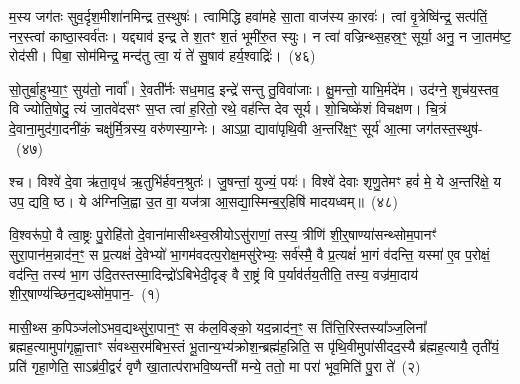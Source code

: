 म॒स्य जग॑तः सुव॒र्दृश॒मीशा॑नमिन्द्र त॒स्थुषः॑। त्वामिद्धि हवा॑महे सा॒ता वाज॑स्य का॒रवः॑। त्वां वृ॒त्रेष्वि॑न्द्र॒ सत्प॑तिं॒ नर॒स्त्वां काष्ठा॒स्वर्व॑तः। यद्द्याव॑ इन्द्र ते श॒तꣳ श॒तं भूमी॑रु॒त स्युः। न त्वा॑ वज्रिन्थ्स॒हस्र॒ꣳ॒ सूर्या॒ अनु॒ न जा॒तम॑ष्ट॒ रोद॑सी। पिबा॒ सोम॑मिन्द्र॒ मन्द॑तु त्वा॒ यं ते॑ सु॒षाव॑ हर्य॒श्वाद्रिः॑।~(४६)

सो॒तुर्बा॒हुभ्या॒ꣳ॒ सुय॑तो॒ नार्वा᳚। रे॒वती᳚र्नः सध॒माद॒ इन्द्रे॑ सन्तु तु॒विवा॑जाः। क्षु॒मन्तो॒ याभि॒र्मदे॑म। उद॑ग्ने॒ शुच॑य॒स्तव॒ वि ज्योति॒षोदु॒ त्यं जा॒तवे॑दसꣳ स॒प्त त्वा॑ ह॒रितो॒ रथे॒ वह॑न्ति देव सूर्य। शो॒चिष्के॑शं विचक्षण। चि॒त्रं दे॒वाना॒मुद॑गा॒दनी॑कं॒ चक्षु॑र्मि॒त्रस्य॒ वरु॑णस्या॒ग्नेः। आ\-ऽप्रा॒ द्यावा॑पृथि॒वी अ॒न्तरि॑क्ष॒ꣳ॒ सूर्य॑ आ॒त्मा जग॑तस्त॒स्थुष॑-~(४७)

श्च। विश्वे॑ दे॒वा ऋ॑ता॒वृध॑ ऋ॒तुभि॑र्\mbox{}हवन॒श्रुतः॑। जु॒षन्तां॒ युज्यं॒ पयः॑। विश्वे॑ देवाः शृणु॒तेमꣳ हवं॑ मे॒ ये अ॒न्तरि॑क्षे॒ य उप॒ द्यवि॒ ष्ठ। ये अ॑ग्निजि॒ह्वा उ॒त वा॒ यज॑त्रा आ॒सद्या॒स्मिन्ब॒र्॒\mbox{}हिषि॑ मादयध्वम्॥~(४८)

{\anuvakamend[{तदीशा॑न॒मद्रि॑स्त॒स्थुष॑स्त्रि॒ꣳ॒शच्च॑}]}%

{}


\setcounter{anuvakam}{0}
वि॒श्वरू॑पो॒ वै त्वा॒ष्ट्रः पु॒रोहि॑तो दे॒वाना॑मासीथ्स्व॒स्रीयो\-ऽसु॑राणां॒ तस्य॒ त्रीणि॑ शी॒र्॒\mbox{}षाण्या॑सन्थ्सोम॒पानꣳ॑ सुरा॒पान॑म॒न्नाद॑न॒ꣳ॒ स प्र॒त्यक्षं॑ दे॒वेभ्यो॑ भा॒गम॑वदत्प॒रोक्ष॒मसु॑रेभ्यः॒ सर्व॑स्मै॒ वै प्र॒त्यक्षं॑ भा॒गं व॑दन्ति॒ यस्मा॑ ए॒व प॒रोक्षं॒ वद॑न्ति॒ तस्य॑ भा॒ग उ॑दि॒तस्तस्मा॒दिन्द्रो॑\-ऽबिभेदी॒दृङ् वै रा॒ष्ट्रं वि प॒र्याव॑र्तय॒तीति॒ तस्य॒ वज्र॑मा॒दाय॑ शी॒र्॒\mbox{}षाण्य॑च्छिन॒द्यथ्सो॑म॒पान॒-~(१)

मासी॒थ्स क॒पिञ्ज॑लो\-ऽभव॒द्यथ्सु॑रा॒पान॒ꣳ॒ स क॑ल॒विङ्को॒ यद॒न्नाद॑न॒ꣳ॒ स ति॑त्ति॒रिस्तस्या᳚ञ्ज॒लिना᳚ ब्रह्मह॒त्यामुपा॑गृह्णा॒त्ताꣳ सं॑वथ्स॒रम॑बिभ॒स्तं भू॒तान्य॒भ्य॑क्रोश॒न्ब्रह्म॑ह॒न्निति॒ स पृ॑थि॒वीमुपा॑सीद\-द॒स्यै ब्र॑ह्मह॒त्यायै॒ तृती॑यं॒ प्रति॑ गृहा॒णेति॒ सा\-ऽब्र॑वी॒द्वरं॑ वृणै खा॒तात्प॑रा\-भवि॒ष्यन्ती॑ मन्ये॒ ततो॒ मा परा॑ भूव॒मिति॑ पु॒रा ते॑~(२)

